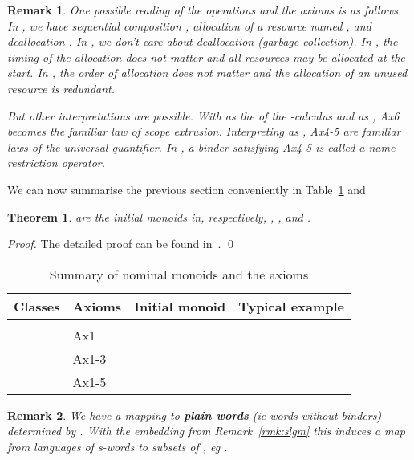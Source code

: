 \documentclass[runningheads,a4paper]{llncs}
\newtheorem{theorem}{Theorem}[section]
\newtheorem{remark}{Theorem}[section]
\newtheorem{theorem}{Theorem}[section]
\newtheorem{remark}{Remark}[section]
\begin{document}
\begin{remark}\label{rmk:axioms}
  One possible reading of the operations and the axioms is as
  follows. In , we have sequential composition ,
  allocation  of a resource named , and deallocation
  . In , we don't care about deallocation (garbage
  collection). In , the timing of the allocation does not
  matter and all resources may be allocated at the start. In
  , the order of allocation does not matter and the
  allocation of an unused resource is redundant.

  But other interpretations are possible. With  as the  of
  the -calculus and  as , Ax6 becomes the familiar
  law of scope extrusion. Interpreting  as , Ax4-5 are
  familiar laws of the universal quantifier. In \cite{pitts:popl10}, a
  binder satisfying Ax4-5 is called a name-restriction operator.
\end{remark}
We can now summarise the previous section conveniently in
Table~\ref{tb:axioms} and
\begin{theorem}\label{thm:monoids}
   are the initial monoids in,
  respectively, , , 
  and .
\end{theorem}
\begin{proof}
  The detailed proof can be found in~\cite{kst10}.
\qed
\end{proof}
\begin{table}[t]
\begin{center}
 \caption{Summary of nominal monoids and the axioms}
 \label{tb:axioms}
\begin{tabular}{|c|p{4cm}|c|p{3.6cm}|}
  \hline
  Classes & Axioms & Initial monoid & Typical example \\
  \hline 
   & &  &   \\
  \hline
   & Ax1 &  
   &  \\
  \hline
  & Ax1-3 
                   &  
                   &   \\
  \hline
  & Ax1-5
                   &  
                   & \\
  \hline
\end{tabular}
\end{center}
\end{table}
\begin{remark}\label{rmk:plain-words}
  We have a mapping  to
  \textbf{plain words} (ie words without binders) determined by
.
With the embedding  from
Remark~\ref{rmk:slgm} this induces a map  from languages
of s-words to subsets of , eg
.
\end{remark}
\end{document}
